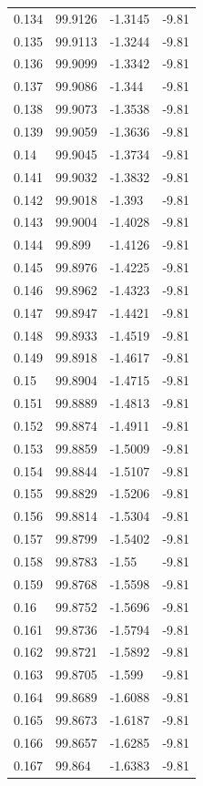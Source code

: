 \begin{tabular}{llll}
0.134 & 99.9126 & -1.3145 & -9.81 \\
0.135 & 99.9113 & -1.3244 & -9.81 \\
0.136 & 99.9099 & -1.3342 & -9.81 \\
0.137 & 99.9086 & -1.344 & -9.81 \\
0.138 & 99.9073 & -1.3538 & -9.81 \\
0.139 & 99.9059 & -1.3636 & -9.81 \\
0.14 & 99.9045 & -1.3734 & -9.81 \\
0.141 & 99.9032 & -1.3832 & -9.81 \\
0.142 & 99.9018 & -1.393 & -9.81 \\
0.143 & 99.9004 & -1.4028 & -9.81 \\
0.144 & 99.899 & -1.4126 & -9.81 \\
0.145 & 99.8976 & -1.4225 & -9.81 \\
0.146 & 99.8962 & -1.4323 & -9.81 \\
0.147 & 99.8947 & -1.4421 & -9.81 \\
0.148 & 99.8933 & -1.4519 & -9.81 \\
0.149 & 99.8918 & -1.4617 & -9.81 \\
0.15 & 99.8904 & -1.4715 & -9.81 \\
0.151 & 99.8889 & -1.4813 & -9.81 \\
0.152 & 99.8874 & -1.4911 & -9.81 \\
0.153 & 99.8859 & -1.5009 & -9.81 \\
0.154 & 99.8844 & -1.5107 & -9.81 \\
0.155 & 99.8829 & -1.5206 & -9.81 \\
0.156 & 99.8814 & -1.5304 & -9.81 \\
0.157 & 99.8799 & -1.5402 & -9.81 \\
0.158 & 99.8783 & -1.55 & -9.81 \\
0.159 & 99.8768 & -1.5598 & -9.81 \\
0.16 & 99.8752 & -1.5696 & -9.81 \\
0.161 & 99.8736 & -1.5794 & -9.81 \\
0.162 & 99.8721 & -1.5892 & -9.81 \\
0.163 & 99.8705 & -1.599 & -9.81 \\
0.164 & 99.8689 & -1.6088 & -9.81 \\
0.165 & 99.8673 & -1.6187 & -9.81 \\
0.166 & 99.8657 & -1.6285 & -9.81 \\
0.167 & 99.864 & -1.6383 & -9.81 \\

\end{tabular}
